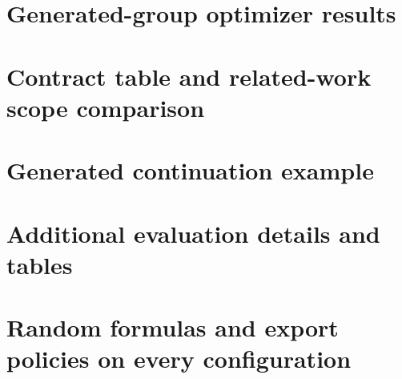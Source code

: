 \documentclass[preprint,12pt]{elsarticle}
\begin{document}
\section{Generated-group optimizer results}\label{sec:generated}


\section{Contract table and related-work scope comparison}


\section{Generated continuation example}


\section{Additional evaluation details and tables}\label{sec:eval-extra}


\section{Random formulas and export policies on every configuration}\label{sec:random}






\end{document}
